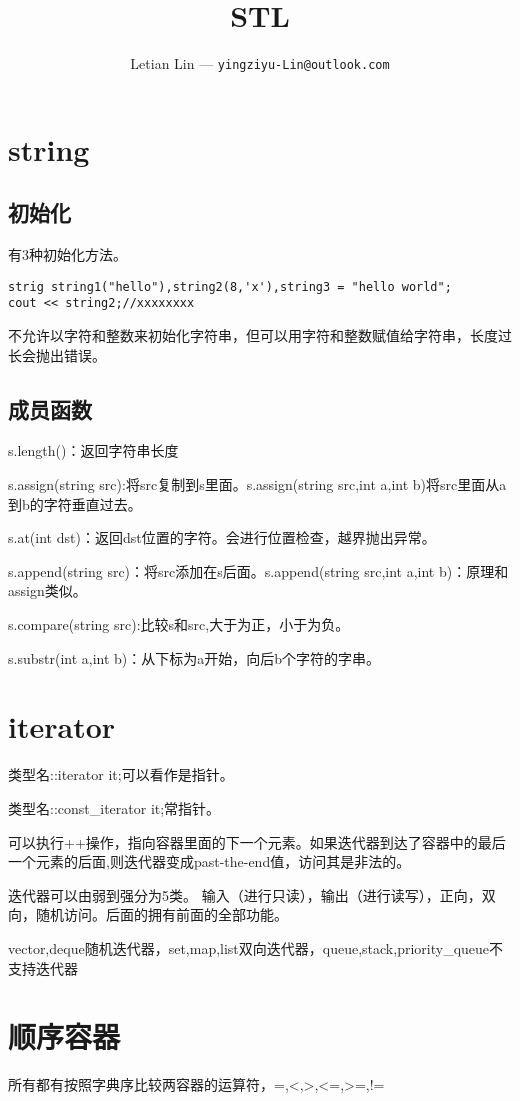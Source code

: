 \documentclass[UTF8]{ctexart}
\title{
	STL
}
\author{
	Letian Lin --- \texttt{yingziyu-Lin@outlook.com}
}
\begin{document}
\maketitle
\section{string}
\subsection{初始化}有3种初始化方法。
\begin{lstlisting}
strig string1("hello"),string2(8,'x'),string3 = "hello world";
cout << string2;//xxxxxxxx
\end{lstlisting}
不允许以字符和整数来初始化字符串，但可以用字符和整数赋值给字符串，长度过长会抛出错误。
\subsection{成员函数}
s.length()：返回字符串长度

s.assign(string src):将src复制到s里面。s.assign(string src,int a,int b)将src里面从a到b的字符垂直过去。

s.at(int dst)：返回dst位置的字符。会进行位置检查，越界抛出异常。

s.append(string src)：将src添加在s后面。s.append(string src,int a,int b)：原理和assign类似。

s.compare(string src):比较s和src,大于为正，小于为负。

s.substr(int a,int b)：从下标为a开始，向后b个字符的字串。

\section{iterator}
类型名::iterator it;可以看作是指针。

类型名::const_iterator it;常指针。

可以执行++操作，指向容器里面的下一个元素。如果迭代器到达了容器中的最后一个元素的后面,则迭代器变成past-the-end值，访问其是非法的。

迭代器可以由弱到强分为5类。
输入（进行只读），输出（进行读写），正向，双向，随机访问。后面的拥有前面的全部功能。

vector,deque随机迭代器，set,map,list双向迭代器，queue,stack,priority_queue不支持迭代器


\section{顺序容器}
所有都有按照字典序比较两容器的运算符，=,<,>,<=,>=,!=
\end{document}
